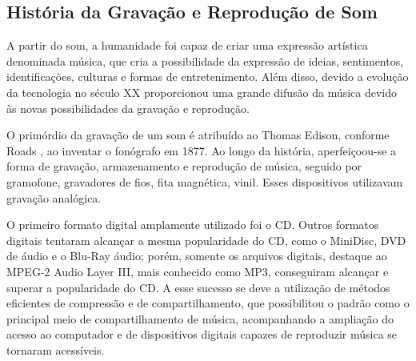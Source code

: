 \subsection{História da Gravação e Reprodução de Som}
A partir do som, a humanidade foi capaz de criar uma expressão artística denominada música, que cria a possibilidade da expressão de ideias, sentimentos, identificações, culturas e formas de entretenimento. Além disso, devido a evolução da tecnologia no século XX proporcionou uma grande difusão da música devido às novas possibilidades da gravação e reprodução. 
\par
O primórdio da gravação de um som é atribuído ao Thomas Edison, conforme Roads \cite{roads1996computer}, ao inventar o fonógrafo em 1877. Ao longo da história, aperfeiçoou-se a forma de gravação, armazenamento e reprodução de música, seguido por gramofone, gravadores de fios, fita magnética, vinil. Esses dispositivos utilizavam gravação analógica.
\par
O primeiro formato digital amplamente utilizado foi o CD. Outros formatos digitais tentaram alcançar a mesma popularidade do CD, como o MiniDisc, DVD de áudio e o Blu-Ray áudio; porém, somente os arquivos digitais, destaque ao MPEG-2 Audio Layer III, mais conhecido como MP3, conseguiram alcançar e superar a popularidade do CD. A esse sucesso se deve a utilização de métodos eficientes de compressão e de compartilhamento, que possibilitou o padrão como o principal meio de compartilhamento de música, acompanhando a ampliação do acesso ao computador e de dispositivos digitais capazes de reproduzir música se tornaram acessíveis.


